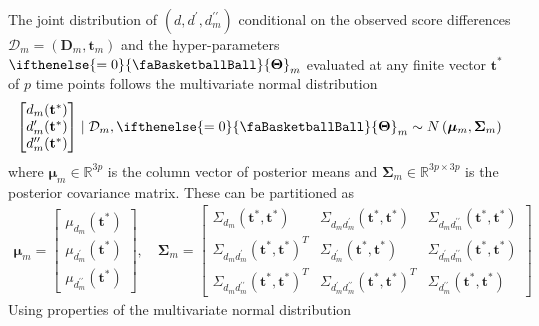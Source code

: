 \documentclass[
  11pt,
]{article}
\theoremstyle{nonumberplain}
\begin{document}
The joint distribution of \((d, d^\prime, d_m^{\prime \prime})\)
conditional on the observed score differences
\(\mathcal{D}_m = (\mathbf{D}_m, \mathbf{t}_m)\) and the
hyper-parameters
\(\ifthenelse{\value{bbsym4theta}=0}{\text{\faBasketballBall}}{\mathbf{\Theta}}_m\)
evaluated at any finite vector \(\mathbf{t}^\ast\) of \(p\) time points
follows the multivariate normal distribution \begin{align*}
\begin{bmatrix}d_m(\mathbf{t}^\ast)\\ d_m^{\prime}(\mathbf{t}^\ast)\\ d_m^{\prime \prime}(\mathbf{t}^\ast)\end{bmatrix} \mid \mathcal{D}_m, \ifthenelse{\value{bbsym4theta}=0}{\text{\faBasketballBall}}{\mathbf{\Theta}}_m \sim N\left(\bm{\mu}_m,  \bm{\Sigma}_m\right)
\end{align*} where \(\bm{\mu}_m \in \mathbb{R}^{3p}\) is the column
vector of posterior means and
\(\bm{\Sigma}_m \in \mathbb{R}^{3p \times 3p}\) is the posterior
covariance matrix. These can be partitioned as \begin{align*}
  \bm{\mu}_m = \begin{bmatrix}\mu_{d_m}(\mathbf{t^\ast})\\ \mu_{d_m^\prime}(\mathbf{t^\ast})\\ \mu_{d_m^{\prime\prime}}(\mathbf{t^\ast})\end{bmatrix}, \quad \bm{\Sigma}_m = \begin{bmatrix}\Sigma_{d_m}(\mathbf{t^\ast},\mathbf{t^\ast}) &  \Sigma_{d_m d_m^\prime}(\mathbf{t^\ast},\mathbf{t^\ast}) & \Sigma_{d_m d_m^{\prime\prime}}(\mathbf{t^\ast},\mathbf{t^\ast})\\  \Sigma_{d_m d_m^\prime}(\mathbf{t^\ast},\mathbf{t^\ast})^T & \Sigma_{d_m^\prime}(\mathbf{t^\ast},\mathbf{t^\ast}) & \Sigma_{d_m^\prime d_m^{\prime\prime}}(\mathbf{t^\ast},\mathbf{t^\ast})\\ \Sigma_{d_m d_m^{\prime\prime}}(\mathbf{t^\ast}, \mathbf{t^\ast})^T & \Sigma_{d_m^\prime d_m^{\prime \prime}}(\mathbf{t^\ast}, \mathbf{t^\ast})^T & \Sigma_{d_m^{\prime\prime}}(\mathbf{t^\ast}, \mathbf{t^\ast})\end{bmatrix} 
\end{align*} Using properties of the multivariate normal distribution
\end{document}
